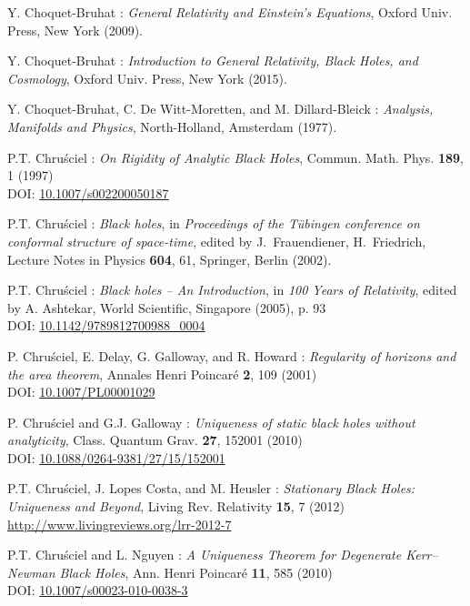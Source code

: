 \begin{thebibliography}{123}
Y. Choquet-Bruhat : {\em General Relativity and Einstein's Equations},
Oxford Univ. Press, New York (2009).

Y. Choquet-Bruhat : {\em Introduction to General Relativity, Black Holes, and
Cosmology}, Oxford Univ. Press, New York (2015).

Y. Choquet-Bruhat, C. De Witt-Moretten, and M. Dillard-Bleick :
{\em Analysis, Manifolds and Physics},
North-Holland, Amsterdam (1977).

P.T. Chru\'sciel : {\em On Rigidity of Analytic Black Holes},
Commun. Math. Phys. {\bf 189}, 1 (1997) \\
DOI: \href{https://doi.org/10.1007/s002200050187}{10.1007/s002200050187}

P.T. Chru\'sciel : {\em Black holes},
in {\em Proceedings of the T\"ubingen conference on conformal structure of
space-time}, edited by J.~Frauendiener, H.~Friedrich,
Lecture Notes in Physics {\bf 604}, 61,
Springer, Berlin (2002).

P.T. Chru\'sciel : {\em Black holes -- An Introduction},
in {\em 100 Years of Relativity}, edited by A. Ashtekar,
World Scientific, Singapore (2005), p. 93\\
DOI: \href{https://doi.org/10.1142/9789812700988_0004}{10.1142/9789812700988\_0004}

P. Chru\'sciel, E. Delay, G. Galloway, and R. Howard :
{\em Regularity of horizons and the area theorem},
Annales Henri Poincar\'e {\bf 2}, 109 (2001)\\
DOI: \href{https://doi.org/10.1007/PL00001029}{10.1007/PL00001029}

P. Chru\'sciel and G.J. Galloway :
{\em Uniqueness of static black holes without analyticity},
Class. Quantum Grav. {\bf 27}, 152001 (2010)\\
DOI: \href{https://doi.org/10.1088/0264-9381/27/15/152001}{10.1088/0264-9381/27/15/152001}

P.T. Chru\'sciel, J. Lopes Costa, and M. Heusler :
{\em Stationary Black Holes: Uniqueness and Beyond},
Living Rev. Relativity {\bf 15}, 7 (2012) \\
\url{http://www.livingreviews.org/lrr-2012-7}

P.T. Chru\'sciel and L. Nguyen :
{\em A Uniqueness Theorem for Degenerate Kerr–Newman Black Holes},
Ann. Henri Poincar\'e {\bf 11}, 585 (2010)\\
DOI: \href{https://doi.org/10.1007/s00023-010-0038-3}{10.1007/s00023-010-0038-3}


\end{thebibliography}
